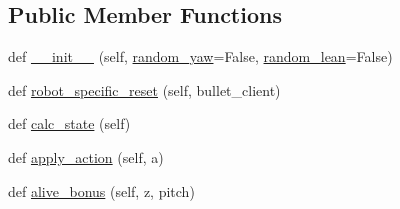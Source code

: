 \subsection*{Public Member Functions}
\begin{DoxyCompactItemize}
\item 
def \hyperlink{classpybullet-gym_1_1pybulletgym_1_1envs_1_1mujoco_1_1robots_1_1locomotors_1_1humanoid_1_1_humanoid_a16826e4f06a87796be8136b0053cd0c0}{\+\_\+\+\_\+init\+\_\+\+\_\+} (self, \hyperlink{classpybullet-gym_1_1pybulletgym_1_1envs_1_1mujoco_1_1robots_1_1locomotors_1_1humanoid_1_1_humanoid_a7bce1af1393e965d200d6770a3da069a}{random\+\_\+yaw}=False, \hyperlink{classpybullet-gym_1_1pybulletgym_1_1envs_1_1mujoco_1_1robots_1_1locomotors_1_1humanoid_1_1_humanoid_ae3fdbd6db63b3694bdb6a155d0d29726}{random\+\_\+lean}=False)
\item 
def \hyperlink{classpybullet-gym_1_1pybulletgym_1_1envs_1_1mujoco_1_1robots_1_1locomotors_1_1humanoid_1_1_humanoid_a606674a9eaa74732f6d35f3bfcbd6370}{robot\+\_\+specific\+\_\+reset} (self, bullet\+\_\+client)
\item 
def \hyperlink{classpybullet-gym_1_1pybulletgym_1_1envs_1_1mujoco_1_1robots_1_1locomotors_1_1humanoid_1_1_humanoid_ab8ec3bbd940c12035ebcfae57e0647c6}{calc\+\_\+state} (self)
\item 
def \hyperlink{classpybullet-gym_1_1pybulletgym_1_1envs_1_1mujoco_1_1robots_1_1locomotors_1_1humanoid_1_1_humanoid_aa0dc14fb044cb1daa293e3531b918820}{apply\+\_\+action} (self, a)
\item 
def \hyperlink{classpybullet-gym_1_1pybulletgym_1_1envs_1_1mujoco_1_1robots_1_1locomotors_1_1humanoid_1_1_humanoid_a73ed2b556d302de4c9d7e1ce4921feec}{alive\+\_\+bonus} (self, z, pitch)
\end{DoxyCompactItemize}
